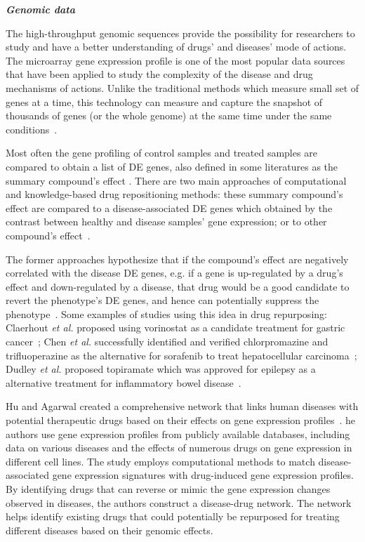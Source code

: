 \textit{\textbf{Genomic data}}

The high-throughput genomic sequences provide the possibility for researchers to study and have a better understanding of drugs' and diseases' mode of actions. 
The microarray gene expression profile is one of the most popular data sources that have been applied to study the complexity of the disease and drug mechanisms of actions. Unlike the traditional methods which measure small set of genes at a time, this technology can measure and capture the snapshot of thousands of genes (or the whole genome) at the same time under the same conditions~\cite{slonim2009getting}. 

Most often the gene profiling of control samples and treated samples are compared to obtain a list of DE genes, also defined in some literatures as the summary compound's effect \cite{shaw2003transcriptional}. 
There are two main approaches of computational and knowledge-based drug repositioning methods: these summary compound's effect are compared to a disease-associated DE genes which obtained by the contrast between healthy and disease samples' gene expression; or to other compound's effect~\cite{iorio2013transcriptional}. 

The former approaches hypothesize that if the compound's effect are negatively correlated with the disease DE genes, e.g. if a gene is up-regulated by a drug's effect and down-regulated by a disease, that drug would be a good candidate to revert the phenotype's DE genes, and hence can potentially suppress the phenotype~\cite{sirota2011discovery, mcart2011identification}. Some examples of studies using this idea in drug repurposing: Claerhout \textit{et al.} proposed using vorinostat as a candidate treatment for gastric cancer~\cite{claerhout2011gene}; Chen \textit{et al.} successfully identified and verified chlorpromazine and trifluoperazine as the alternative for sorafenib to treat hepatocellular carcinoma~\cite{chen2011gene}; Dudley \textit{et al.} proposed topiramate which was approved for epilepsy as a alternative treatment for inflammatory bowel disease~\cite{dudley2011computational}. 

Hu and Agarwal created a comprehensive network that links human diseases with potential therapeutic drugs based on their effects on gene expression profiles~\cite{hu2009human}.
he authors use gene expression profiles from publicly available databases, including data on various diseases and the effects of numerous drugs on gene expression in different cell lines.
The study employs computational methods to match disease-associated gene expression signatures with drug-induced gene expression profiles.
By identifying drugs that can reverse or mimic the gene expression changes observed in diseases, the authors construct a disease-drug network.
The network helps identify existing drugs that could potentially be repurposed for treating different diseases based on their genomic effects.

